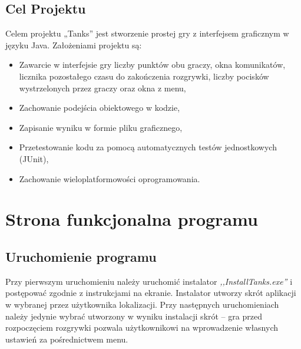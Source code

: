 \documentclass[11pt,a4paper]{report}
\begin{document}
\subsection {Cel Projektu}
Celem projektu „Tanks” jest stworzenie prostej gry z interfejsem graficznym w języku Java. Założeniami projektu są:
\begin {itemize}
\item Zawarcie w interfejsie gry liczby punktów obu graczy, okna komunikatów, licznika pozostałego czasu do zakończenia rozgrywki, liczby pocisków wystrzelonych przez graczy oraz okna z menu,
\item Zachowanie podejścia obiektowego w kodzie,
\item Zapisanie wyniku w formie pliku graficznego,
\item Przetestowanie kodu za pomocą automatycznych testów jednostkowych (JUnit),
\item Zachowanie wieloplatformowości oprogramowania.
\end {itemize}
\newpage

\section{Strona funkcjonalna programu}\label{sec:tekst}

\subsection {Uruchomienie programu}
Przy pierwszym uruchomieniu należy uruchomić instalator \textsl{,,InstallTanks.exe''} i postępować zgodnie z instrukcjami na ekranie. Instalator utworzy skrót aplikacji w wybranej przez użytkownika lokalizacji. Przy następnych uruchomieniach należy jedynie wybrać utworzony w wyniku instalacji skrót -- gra przed rozpoczęciem rozgrywki pozwala użytkownikowi na wprowadzenie własnych ustawień za pośrednictwem menu.
\end{document}
